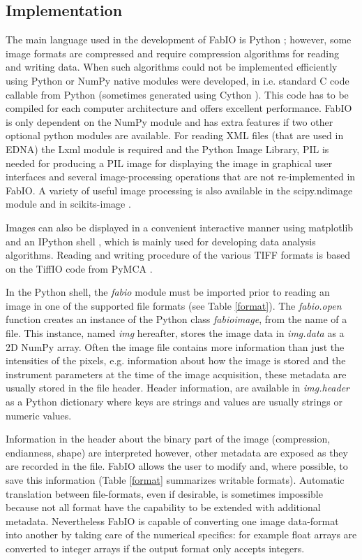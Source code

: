 \documentclass[preprint]{iucr}
\begin{document}
\subsection{Implementation}
The main language used in the development of FabIO is Python \cite{python};
however, some image formats are compressed and require
compression algorithms for reading and writing data. 
When such algorithms could not be implemented efficiently using Python or NumPy
native modules were developed, in i.e. standard C code callable from Python
(sometimes generated using Cython \cite{cython}).
This code has to be compiled for each computer architecture and offers 
excellent performance.
FabIO is only dependent on the NumPy module and has extra features if two other
optional python modules are available. 
For reading XML files (that are used in EDNA) the Lxml  module \cite{lxml} is
required and the Python Image Library, PIL \cite{pil} is needed for producing 
a PIL image for displaying the image in graphical user interfaces and several 
image-processing operations that are not re-implemented in FabIO.
A variety of useful image processing is also available in the scipy.ndimage 
module \cite{scipy} and in scikits-image \cite{skimage}.

Images can also be displayed in a convenient interactive manner using
matplotlib \cite{matplotlib} and an IPython shell \cite{ipython}, which is
mainly used for developing data analysis algorithms.
Reading and writing procedure of the various TIFF \cite{tiff} formats is based
on the TiffIO code from PyMCA \cite{pymca}.

In the Python shell, the {\em fabio} module must be imported prior to reading an
image in one of the supported file formats (see Table \ref{format}).
The {\em fabio.open} function creates an instance of the Python class {\em fabioimage},
from the name of a file. This instance, named {\em img} hereafter, stores the
image data in {\em img.data} as a 2D NumPy array. Often the image file contains
more information than just the intensities of the pixels, e.g.
information about how the image is stored and the instrument parameters at the
time of the image acquisition, these metadata are usually stored in
the file header.
Header information, are available in {\em img.header} as a Python
dictionary where keys are strings and values are usually strings or
numeric values.

Information in the header about the binary part of the image (compression,
endianness, shape) are interpreted however, other metadata are exposed as
they are recorded in the file. FabIO allows the user to modify
and, where possible, to save this information (Table \ref{format} summarizes
writable formats).
Automatic translation between file-formats, even if desirable, is sometimes
impossible because not all format have the capability to be extended with
additional metadata. 
Nevertheless FabIO is capable of converting one
image data-format into another by taking care of the numerical specifics: 
for example float arrays are converted to integer arrays if the output format only
accepts integers.
\end{document}
